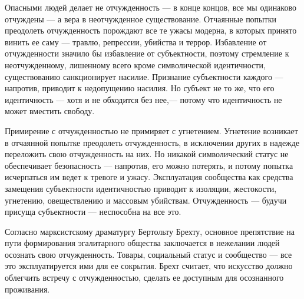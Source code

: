 \documentclass[12pt]{book}
\begin{document}
Опасными людей делает не отчужденность --- в конце концов, все мы одинаково отчуждены --- а вера в неотчужденное существование. Отчаянные попытки преодолеть отчужденность порождают все те ужасы модерна, в которых принято винить ее саму --- травлю, репрессии, убийства и террор. Избавление от отчужденности значило бы избавление от субъектности, поэтому стремление к неотчужденному, лишенному всего кроме символической идентичности, существованию санкционирует насилие. Признание субъектности каждого --- напротив, приводит к недопущению насилия. Но субъект не то же, что его идентичность --- хотя и не обходится без нее,--- потому что идентичность не может вместить свободу.

Примирение с отчужденностью не примиряет с угнетением. Угнетение возникает в отчаянной попытке преодолеть отчужденность, в исключении других в надежде переложить свою отчужденность на них. Но никакой символический статус не обеспечивает безопасность --- напротив, его можно потерять, и потому попытка исчерпаться им ведет к тревоге и ужасу. Эксплуатация сообщества как средства замещения субъектности идентичностью приводит к изоляции, жестокости, угнетению, овеществлению и массовым убийствам. Отчужденность --- будучи присуща субъектности --- неспособна на все это.

Согласно марксистскому драматургу Бертольту Брехту, основное препятствие на пути формирования эгалитарного общества заключается в нежелании людей осознать свою отчужденность. Товары, социальный статус и сообщество --- все это эксплуатируется ими для ее сокрытия. Брехт считает, что искусство должно облегчить встречу с отчужденностью, сделать ее доступным для осознанного проживания.
\end{document}
